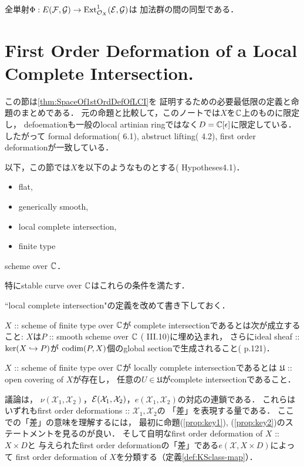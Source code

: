 \documentclass[a4paper]{jsarticle}
\newcommand{\famX}{\mathcal{X}}
\newcommand{\cvU}{\mathfrak{U}}
\begin{document}
    \begin{Lemma}\label{lemma:PshiIsIso}
        全単射$\Phi: E(\mathcal{F}, \mathcal{G}) \to \operatorname{Ext}^1_{\mathcal{O}_X}(\mathcal{E}, \mathcal{G})$は
        加法群の間の同型である．
    \end{Lemma}

\section{First Order Deformation of a Local Complete Intersection.}
    この節は\ref{thm:SpaceOf1stOrdDefOfLCI}を
    証明するための必要最低限の定義と命題のまとめである．
    元の命題と比較して，このノートでは$X$を$\mathbb{C}$上のものに限定し，
    defoemationも一般のlocal artinian ringではなく$D=\mathbb{C}[\epsilon]$に限定している．
    したがって
    formal deformation(\cite{DefLCI} 6.1),
    abstruct lifting(\cite{DefLCI} 4.2), 
    first order deformationが一致している．

    以下，この節では$X$を以下のようなものとする(\cite{DefLCI} Hypotheses4.1)．
    \begin{screen}
    \begin{itemize}
        \item flat,
        \item generically smooth,
        \item local complete intersection,
        \item finite type
    \end{itemize}
        scheme over $\mathbb{C}$．
    \end{screen}
    特にstable curve over $\mathbb{C}$はこれらの条件を満たす．

    ``local complete intersection"の定義を改めて書き下しておく．
    \begin{Def}
        $X$ :: scheme of finite type over $\mathbb{C}$が
        complete intersectionであるとは次が成立すること:
        $X$は$P$ :: smooth scheme over $\mathbb{C}$ (\cite{HarAG} III.10)に埋め込まれ，
        さらにideal sheaf :: $\ker(X \hookrightarrow P)$が
        $\operatorname{codim}(P, X)$個のglobal sectionで生成されること(\cite{HarAG} p.121)．

        $X$ :: scheme of finite type over $\mathbb{C}$が
        locally complete intersectionであるとは
        $\cvU$ :: open covering of $X$が存在し，
        任意の$U \in \cvU$がcomplete intersectionであること．
    \end{Def}
    
    議論は，
    $\nu(\famX_1, \famX_2)$，$\shE(\famX_1, \famX_2)$，$e(\famX_1, \famX_2)$の対応の連鎖である．
    これらはいずれもfirst order deformations :: $\famX_1, \famX_2$の
    「差」を表現する量である．
    ここでの「差」の意味を理解するには，
    最初に命題(\ref{prop:key1}), (\ref{prop:key2})のステートメントを見るのが良い．
    そして自明なfirst order deformation of $X$ :: $X \times D$と
    与えられたfirst order deformationの「差」である$e(\famX, X \times D)$によって
    first order deformation of $X$を分類する（定義\ref{def:KSclass-map}）．
\end{document}
